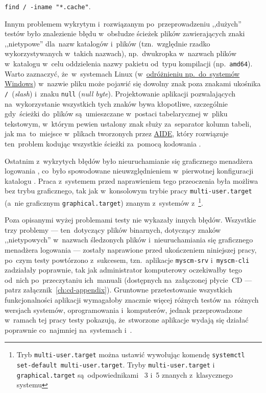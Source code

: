 \documentclass[thesis]{subfiles}
\begin{document}
\begin{center}
	\texttt{find / -iname "*.cache"}.
\end{center}

Innym problemem wykrytym i~rozwiązanym po~przeprowadzeniu ,,dużych'' testów było znalezienie błędu w~obsłudze ścieżek plików zawierających znaki ,,nietypowe'' dla~nazw katalogów i~plików (tzn.~względnie rzadko wykorzystywanych w~takich nazwach), np.~dwukropka w~nazwach plików w~katalogu  w~celu oddzielenia nazwy pakietu od~typu kompilacji (np.~\texttt{amd64}). Warto zaznaczyć, że~w~systemach Linux (w~\href{https://stackoverflow.com/questions/1976007/what-characters-are-forbidden-in-windows-and-linux-directory-names}{odróżnieniu np.~do~systemów Windows}) w~nazwie pliku może pojawić się dowolny znak poza znakami ukośnika \texttt{/}~(\emph{slash}) i~znaku \texttt{null} (\emph{null byte}). Projektowanie aplikacji pozwalających na~wykorzystanie wszystkich tych znaków bywa kłopotliwe, szczególnie gdy~ścieżki do~plików są~umieszczane w~postaci tabelarycznej w~pliku tekstowym, w~którym pewien ustalony znak służy za~separator kolumn tabeli, jak ma~to~miejsce w~plikach tworzonych przez \hyperlink{sec:aide}{AIDE}, który rozwiązuje ten~problem kodując wszystkie ścieżki za~pomocą kodowania .

Ostatnim z~wykrytych błędów było nieuruchamianie się graficznego menadżera logowania , co~było spowodowane nieuwzględnieniem w~pierwotnej konfiguracji \texttt{\srvappname} katalogu . Praca z~systemem przed naprawieniem tego przeoczenia była możliwa bez trybu graficznego, tak jak w~konsolowym trybie pracy \texttt{multi-user.target} (a~nie graficznym \texttt{graphical.target}) znanym z~systemów z~\footnote{Tryb \texttt{multi-user.target} można ustawić wywołując komendę \texttt{systemctl set-default multi-user.target}. Tryby \texttt{multi-user.target} i \texttt{graphical.target} są~odpowiednikami ~3 i~5 znanych z~klasycznego systemu }.

Poza opisanymi wyżej problemami testy nie wykazały innych błędów. Wszystkie trzy problemy --- ten~dotyczący plików binarnych, dotyczący znaków ,,nietypowych'' w~nazwach śledzonych plików i~nieuruchamiania się graficznego menadżera logowania --- zostały naprawione przed ukończeniem niniejszej pracy, po~czym testy powtórzono z~sukcesem, tzn.~aplikacje \texttt{myscm-srv} i~\texttt{myscm-cli} zadziałały poprawnie, tak jak administrator komputerowy oczekiwałby tego od~nich po~przeczytaniu ich~manuali (dostępnych na~załączonej płycie~CD --- patrz załącznik~\ref{ch:cd-appendix}). Gruntowne przetestowanie wszystkich funkcjonalności aplikacji wymagałoby znacznie więcej różnych testów na~różnych wersjach systemów, oprogramowania i~komputerów, jednak przeprowadzone w~ramach tej pracy testy pokazują, że~stworzone aplikacje wydają się działać poprawnie co~najmniej na~systemach \linuxdebian{} i~\linuxarch{}.
\end{document}
